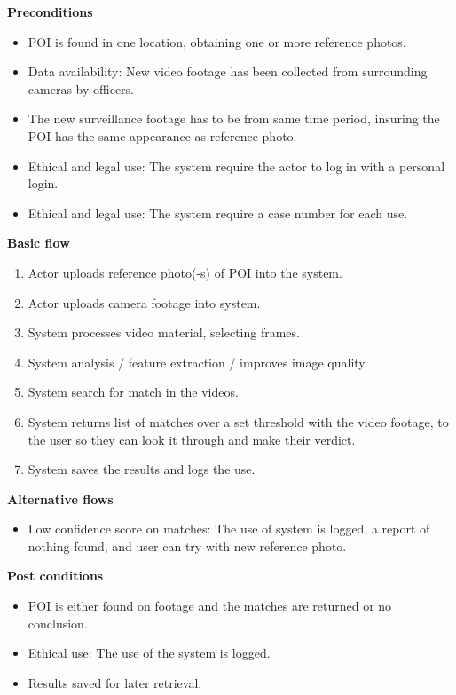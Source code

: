 \vspace{1em}

\noindent\textbf{Preconditions}
\begin{itemize}
    \item \acs{POI} is found in one location, obtaining one or more reference photos.
    \item Data availability: New video footage has been collected from surrounding cameras by officers.
    \item The new surveillance footage has to be from same time period, insuring the \acs{POI} has the same appearance as reference photo.
    \item Ethical and legal use: The system require the actor to log in with a personal login.
    \item Ethical and legal use: The system require a case number for each use.
\end{itemize}
\vspace{1em}

\noindent\textbf{Basic flow}
\begin{enumerate}
\item  Actor uploads reference photo(-s) of \acs{POI} into the system.
\item Actor uploads camera footage into system.
\item System processes video material, selecting frames.
\item System analysis / feature extraction / improves image quality.
\item System search for match in the videos.
\item System returns list of matches over a set threshold with the video footage, to the user so they can look it through and make their verdict.
\item System saves the results and logs the use.
\end{enumerate}
\vspace{1em}

\noindent\textbf{Alternative flows}
\begin{itemize}
    \item Low confidence score on matches: The use of system is logged, a report of nothing found, and user can try with new reference photo.
\end{itemize}
\vspace{1em}

\noindent\textbf{Post conditions} 
\begin{itemize}
    \item \acs{POI} is either found on footage and the matches are returned or no conclusion.
    \item Ethical use: The use of the system is logged.
    \item Results saved for later retrieval.
\end{itemize}




